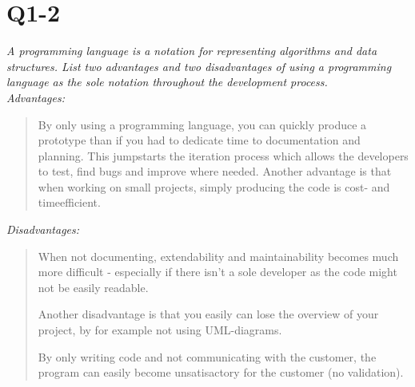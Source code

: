\section{Q1-2}
\emph{A programming language is a notation for representing algorithms and data structures. List two advantages and two disadvantages of using a programming language as the sole notation throughout the development process.}\\

\emph{Advantages:}
\begin{quote}
By only using a programming language, you can quickly produce a prototype than if you had to dedicate time to documentation and planning. 
This jumpstarts the iteration process which allows the developers to test, find bugs and improve where needed.
Another advantage is that when working on small projects, simply producing the code is cost- and timeefficient.\\
\end{quote}

\emph{Disadvantages:}
\begin{quote}
When not documenting, extendability and maintainability becomes much more difficult - especially if there isn't a sole developer as the code might not be easily readable.

Another disadvantage is that you easily can lose the overview of your project, by for example not using UML-diagrams. 

By only writing code and not communicating with the customer, the program can easily become unsatisactory for the customer (no validation).
\end{quote}
